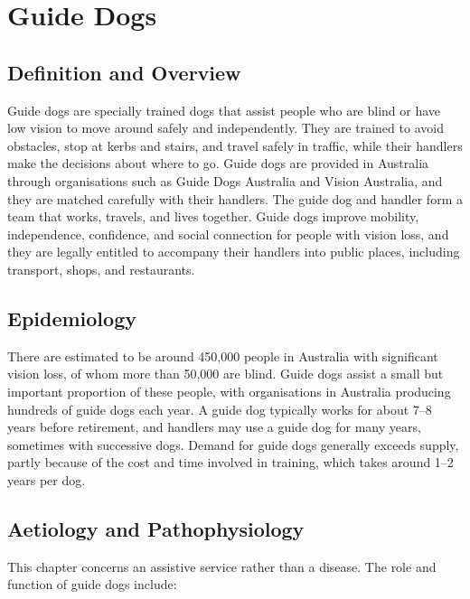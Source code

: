 \chapter{Guide Dogs}

\section*{Definition and Overview}
Guide dogs are specially trained dogs that assist people who are blind or have low vision to move around safely and independently. They are trained to avoid obstacles, stop at kerbs and stairs, and travel safely in traffic, while their handlers make the decisions about where to go. Guide dogs are provided in Australia through organisations such as Guide Dogs Australia and Vision Australia, and they are matched carefully with their handlers. The guide dog and handler form a team that works, travels, and lives together. Guide dogs improve mobility, independence, confidence, and social connection for people with vision loss, and they are legally entitled to accompany their handlers into public places, including transport, shops, and restaurants.

\section*{Epidemiology}
There are estimated to be around 450,000 people in Australia with significant vision loss, of whom more than 50,000 are blind. Guide dogs assist a small but important proportion of these people, with organisations in Australia producing hundreds of guide dogs each year. A guide dog typically works for about 7--8 years before retirement, and handlers may use a guide dog for many years, sometimes with successive dogs. Demand for guide dogs generally exceeds supply, partly because of the cost and time involved in training, which takes around 1--2 years per dog.

\section*{Aetiology and Pathophysiology}
This chapter concerns an assistive service rather than a disease. The role and function of guide dogs include:

